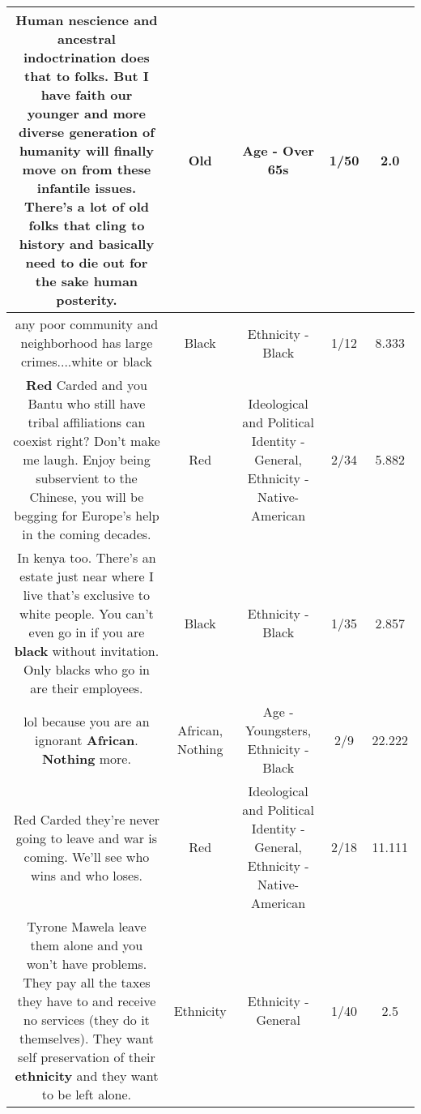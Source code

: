 \documentclass[11pt]{article}
\newlength\mylength
\begin{document}
\begin{center}
\begin{longtable}{|C{.65\mylength}|C{.30\mylength}|C{.12\mylength}|C{.12\mylength}|C{.12\mylength}|}
  \small Human nescience and ancestral indoctrination does that to folks. But I have faith our younger and more diverse generation of humanity will finally move on from these infantile issues. There's a lot of \textbf{old} folks that cling to history and basically need to die out for the sake human posterity.\normalsize   & Old & Age - Over 65s & 1/50 & 2.0 \\  \hline
  \small {} any poor community and neighborhood has large crimes....white or black\normalsize   & Black & Ethnicity - Black & 1/12 & 8.333 \\  \hline
  \small \@\textbf{R\textbf{ed}} Carded and you Bantu who still have tribal affiliations can coexist right? Don't make me laugh. Enjoy being subservient to the Chinese, you will be begging for Europe's help in the coming decades.\normalsize   & Red &  Ideological and Political Identity - General, Ethnicity - Native-American & 2/34 & 5.882 \\  \hline
  \small In kenya too. There's an estate just near where I live that's exclusive to white people. You can't even go in if you are \textbf{black} without invitation. Only blacks who go in are their employees.\normalsize   & Black & Ethnicity - Black & 1/35 & 2.857 \\  \hline
  \small lol because you are an ignorant \textbf{African}. \textbf{Nothing} more.\normalsize   & African, Nothing & Age - Youngsters, Ethnicity - Black & 2/9 & 22.222 \\  \hline
  \small Red Carded they're never going to leave and war is coming. We'll see who wins and who loses.\normalsize   & Red &  Ideological and Political Identity - General, Ethnicity - Native-American & 2/18 & 11.111 \\  \hline
  \small Tyrone Mawela leave them alone and you won't have problems. They pay all the taxes they have to and receive no services (they do it themselves). They want self preservation of their \textbf{ethnicity} and they want to be left alone.\normalsize   & Ethnicity & Ethnicity - General & 1/40 & 2.5 \\  \hline

\end{longtable}
\end{center}
\end{document}
